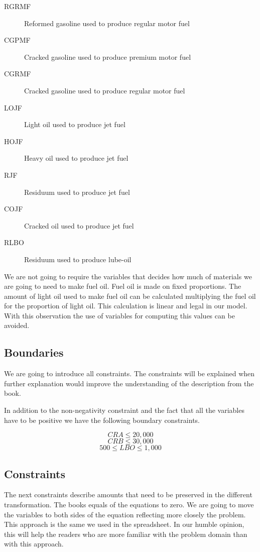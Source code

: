 \documentclass[12pt,a4paper]{report}
\begin{document}
\begin{description}
\item[RGRMF]
Reformed gasoline used to produce regular motor fuel
\item[CGPMF]
Cracked gasoline used to produce premium motor fuel
\item[CGRMF]
Cracked gasoline used to produce regular motor fuel
\item[LOJF]
Light oil used to produce jet fuel
\item[HOJF]
Heavy oil used to produce jet fuel
\item[RJF]
Residuum used to produce jet fuel
\item[COJF]
Cracked oil used to produce jet fuel
\item[RLBO]
Residuum used to produce lube-oil
\end{description}

We are not going to require the variables that decides how much of materials we are going to need to make fuel oil. Fuel oil is made on fixed proportions. The amount of light oil used to make fuel oil can be calculated multiplying the fuel oil for the proportion of light oil. This calculation is linear and legal in our model. With this observation the use of variables for computing this values can be avoided.

\subsection{Boundaries}

We are going to introduce all constraints. The constraints will be explained when further explanation would improve the understanding of the description from the book.

In addition to the non-negativity constraint and the fact that all the variables have to be positive we have the following boundary constraints.

\begin{equation}
CRA\leq 20,000
\end{equation}
\begin{equation}
CRB\leq 30,000
\end{equation}
\begin{equation}
500 \leq LBO \leq 1,000
\end{equation}
\subsection{Constraints}

The next constraints describe amounts that need to be preserved in the different transformation. The books equals of the equations to zero. We are going to move the variables to both sides of the equation reflecting more closely the problem. This approach is the same we used in the spreadsheet. In our humble opinion, this will help the readers who are more familiar with the problem domain than with this approach.
\end{document}
